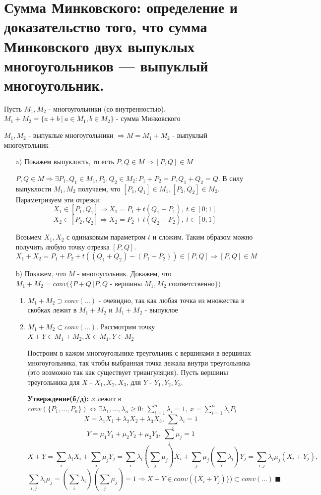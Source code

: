 \section{Сумма Минковского: определение и доказательство того, что сумма Минковского двух выпуклых многоугольников — выпуклый многоугольник.}
\par \Def Пусть $M_1, M_2$ - многоугольники (со внутренностью). $M_1+M_2 = \{a+b \: | \: a \in M_1, b \in M_2\}$ - сумма Минковского
\par \Statement $M_1, M_2$ - выпуклые многоугольники $\Rightarrow M=M_1+M_2$ - выпуклый многоугольник
\par \begin{itemize}
    \item[\Proof a)] Покажем выпуклость, то есть $P,Q \in M \Rightarrow [P,Q] \in M$
    \par $P,Q \in M \Rightarrow \exists P_1, Q_1 \in M_1, P_2, Q_2 \in M_2: P_1+P_2=P, Q_1+Q_2=Q$. В силу выпуклости $M_1, M_2$ получаем, что $[P_1, Q_1] \in M_1, [P_2, Q_2] \in M_2$. Параметризуем эти отрезки:
    $$X_1 \in [P_1, Q_1] \Rightarrow X_1 = P_1 + t(Q_1-P_1), \: t \in [0;1]$$
    $$X_2 \in [P_2, Q_2] \Rightarrow X_2 = P_2 + t(Q_2 - P_2), \: t \in [0;1]$$
    \par Возьмем $X_1, X_2$ с одинаковым параметром $t$ и сложим. Таким образом можно получить любую точку отрезка $[P,Q]$. 
    $$X_1+X_2=P_1+P_2+t((Q_1+Q_2)-(P_1+P_2)) \in [P, Q] \Rightarrow [P, Q] \in M$$
    \item[b)] Покажем, что $M$ - многоугольник. Докажем, что $M_1+M_2 = conv(\{P+Q \: | P, Q$ - вершины $M_1, M_2$ соответственно$\})$
    \begin{enumerate}
        \item $M_1+M_2 \supset conv(\ldots)$ - очевидно, так как любая точка из множества в скобках лежит в $M_1+M_2$ и $M_1+M_2$ - выпуклое
        \item $M_1+M_2 \subset conv(\ldots)$. Рассмотрим точку $X+Y \in M_1+M_2, X \in M_1, Y \in M_2$
        \par Построим в кажом многоугольнике треугольник с вершинами в вершинах многоугольника, так чтобы выбранная точка лежала внутри треугольника (это возможно так как существует триангуляция). Пусть вершины треугольника для $X$ - $X_1, X_2, X_3$, для $Y$ - $Y_1, Y_2, Y_3$.
        \par \textbf{Утверждение(б/д):} $x$ лежит в $conv(\{P_1, \ldots, P_n\}) \Leftrightarrow \exists \lambda_1, \ldots, \lambda_n \geq 0: \: \sum_{i=1}^n \lambda_i = 1, \: x = \sum_{i=1}^n \lambda_i P_i$ 
        $$X=\lambda_1X_1+\lambda_2X_2+\lambda_3X_3, \: \sum_i \lambda_i=1$$
        $$Y=\mu_1Y_1+\mu_2Y_2+\mu_3Y_3, \: \sum_j \mu_j = 1$$
        $$X+Y=\sum_i \lambda_iX_i + \sum_j \mu_j Y_j=\sum_i \lambda_i(\sum_j \mu_j)X_i + \sum_j \mu_j(\sum_i \lambda_i)Y_j=\sum_{i,j} \lambda_i \mu_j (X_i+Y_j),$$$$\sum_{i,j} \lambda_i \mu_j=(\sum_i \lambda_i)(\sum_j \mu_j) = 1 \Rightarrow X+Y \in conv(\{X_i+Y_j)\})\subset conv(\ldots) \: \blacksquare$$
    \end{enumerate}
    
\end{itemize}
\newpage{}

